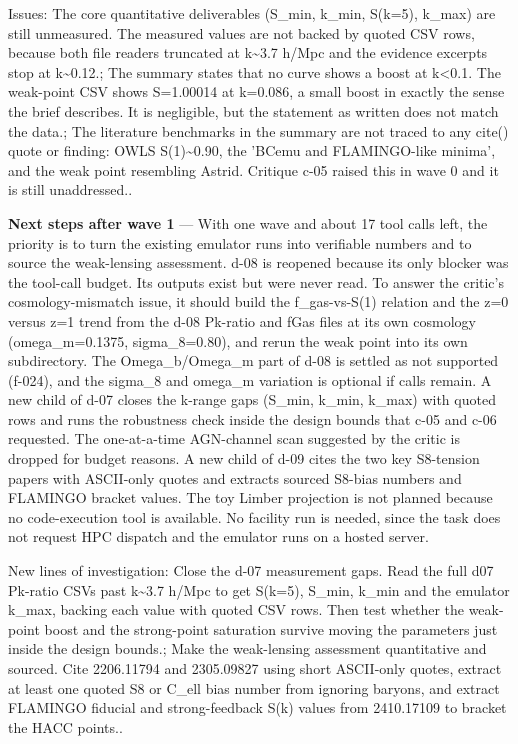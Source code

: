 \documentclass[11pt,a4paper]{article}
\begin{document}
Issues: The core quantitative deliverables (S\_min, k\_min, S(k=5), k\_max) are still unmeasured. The measured values are not backed by quoted CSV rows, because both file readers truncated at k\textasciitilde{}3.7 h/Mpc and the evidence excerpts stop at k\textasciitilde{}0.12.; The summary states that no curve shows a boost at k\textless{}0.1. The weak-point CSV shows S=1.00014 at k=0.086, a small boost in exactly the sense the brief describes. It is negligible, but the statement as written does not match the data.; The literature benchmarks in the summary are not traced to any cite() quote or finding: OWLS S(1)\textasciitilde{}0.90, the 'BCemu and FLAMINGO-like minima', and the weak point resembling Astrid. Critique c-05 raised this in wave 0 and it is still unaddressed..

\textbf{Next steps after wave 1} --- With one wave and about 17 tool calls left, the priority is to turn the existing emulator runs into verifiable numbers and to source the weak-lensing assessment. d-08 is reopened because its only blocker was the tool-call budget. Its outputs exist but were never read. To answer the critic's cosmology-mismatch issue, it should build the f\_gas-vs-S(1) relation and the z=0 versus z=1 trend from the d-08 Pk-ratio and fGas files at its own cosmology (omega\_m=0.1375, sigma\_8=0.80), and rerun the weak point into its own subdirectory. The Omega\_b/Omega\_m part of d-08 is settled as not supported (f-024), and the sigma\_8 and omega\_m variation is optional if calls remain. A new child of d-07 closes the k-range gaps (S\_min, k\_min, k\_max) with quoted rows and runs the robustness check inside the design bounds that c-05 and c-06 requested. The one-at-a-time AGN-channel scan suggested by the critic is dropped for budget reasons. A new child of d-09 cites the two key S8-tension papers with ASCII-only quotes and extracts sourced S8-bias numbers and FLAMINGO bracket values. The toy Limber projection is not planned because no code-execution tool is available. No facility run is needed, since the task does not request HPC dispatch and the emulator runs on a hosted server.

New lines of investigation: Close the d-07 measurement gaps. Read the full d07 Pk-ratio CSVs past k\textasciitilde{}3.7 h/Mpc to get S(k=5), S\_min, k\_min and the emulator k\_max, backing each value with quoted CSV rows. Then test whether the weak-point boost and the strong-point saturation survive moving the parameters just inside the design bounds.; Make the weak-lensing assessment quantitative and sourced. Cite 2206.11794 and 2305.09827 using short ASCII-only quotes, extract at least one quoted S8 or C\_ell bias number from ignoring baryons, and extract FLAMINGO fiducial and strong-feedback S(k) values from 2410.17109 to bracket the HACC points..
\end{document}

